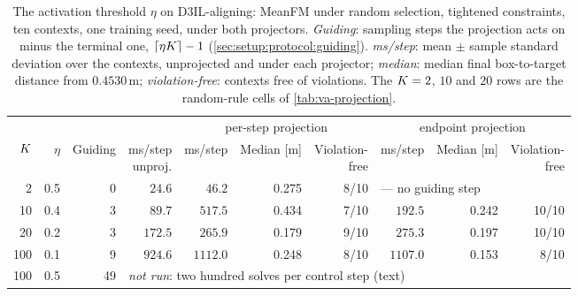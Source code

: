 \begin{table}[htpb]
  \caption[Alignment: the activation threshold across the budget ladder]{The activation threshold
  $\eta$ on D3IL-aligning: MeanFM under random selection, tightened constraints, ten contexts, one
  training seed, under both projectors. \emph{Guiding}: sampling steps the projection acts on minus the
  terminal one, $\lceil \eta K \rceil - 1$ (\autoref{sec:setup:protocol:guiding}). \emph{ms/step}:
  mean $\pm$ sample standard deviation over the contexts, unprojected and under each projector;
  \emph{median}: median final box-to-target distance from $0.4530$\,m; \emph{violation-free}: contexts free of
  violations. The $K=2$, $10$ and $20$ rows are the random-rule cells of \autoref{tab:va-projection}.}
  \label{tab:va-threshold}
  \centering
  \footnotesize
  \setlength{\tabcolsep}{3pt}
  \begin{tabularx}{\linewidth}{@{}r r r r rrr rrr@{}}
    \toprule
    & & & & \multicolumn{3}{c}{per-step projection} & \multicolumn{3}{c}{endpoint projection} \\
    \cmidrule(lr){5-7}\cmidrule(l){8-10}
    $K$ & $\eta$ & Guiding & \shortstack{ms/step\\unproj.} & ms/step & Median [m] & \shortstack{Violation-\\free} & ms/step & Median [m] & \shortstack{Violation-\\free} \\
    \midrule
    2   & 0.5 & 0  & $24.6$  & $46.2$  & 0.275 & 8/10  & \multicolumn{3}{l}{--- no guiding step} \\
    10  & 0.4 & 3  & $89.7$  & $517.5$ & 0.434 & 7/10  & $192.5$ & 0.242 & 10/10 \\
    20  & 0.2 & 3  & $172.5$ & $265.9$ & 0.179 & 9/10  & $275.3$ & 0.197 & 10/10 \\
    100 & 0.1 & 9  & $924.6$ & $1112.0$ & 0.248 & 8/10 & $1107.0$ & 0.153 & 8/10 \\
    100 & 0.5 & 49 & \multicolumn{7}{l}{\emph{not run}: two hundred solves per control step (text)} \\
    \bottomrule
  \end{tabularx}
\end{table}

